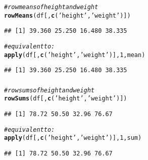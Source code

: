 \documentclass[12pt]{beamer}\usepackage[]{graphicx}\usepackage[]{color}
\makeatletter
\newcommand{\hlnum}[1]{\textcolor[rgb]{0.686,0.059,0.569}{#1}}%
\newcommand{\hlstr}[1]{\textcolor[rgb]{0.192,0.494,0.8}{#1}}%
\newcommand{\hlcom}[1]{\textcolor[rgb]{0.678,0.584,0.686}{\textit{#1}}}%
\newcommand{\hlstd}[1]{\textcolor[rgb]{0.345,0.345,0.345}{#1}}%
\newcommand{\hlkwd}[1]{\textcolor[rgb]{0.737,0.353,0.396}{\textbf{#1}}}%
\newenvironment{kframe}{%
 \def\at@end@of@kframe{}%
 \ifinner\ifhmode%
  \def\at@end@of@kframe{\end{minipage}}%
  \begin{minipage}{\columnwidth}%
 \fi\fi%
 \def\FrameCommand##1{\hskip\@totalleftmargin \hskip-\fboxsep
 \colorbox{shadecolor}{##1}\hskip-\fboxsep
     \hskip-\linewidth \hskip-\@totalleftmargin \hskip\columnwidth}%
 \MakeFramed {\advance\hsize-\width
   \@totalleftmargin\z@ \linewidth\hsize
   \@setminipage}}%
 {\par\unskip\endMakeFramed%
 \at@end@of@kframe}
\newenvironment{knitrout}{}{} %
\makeatother
\begin{document}
\begin{frame}[fragile]
\frametitle{}

\begin{knitrout}\footnotesize
{}\color{fgcolor}\begin{kframe}
\begin{alltt}
\hlcom{# row means of height and weight}
\hlkwd{rowMeans}\hlstd{(df[ ,}\hlkwd{c}\hlstd{(}\hlstr{'height'}\hlstd{,} \hlstr{'weight'}\hlstd{)])}
\end{alltt}
\begin{verbatim}
## [1] 39.360 25.250 16.480 38.335
\end{verbatim}
\begin{alltt}
\hlcom{# equivalent to:}
\hlkwd{apply}\hlstd{(df[ ,}\hlkwd{c}\hlstd{(}\hlstr{'height'}\hlstd{,} \hlstr{'weight'}\hlstd{)],} \hlnum{1}\hlstd{, mean)}
\end{alltt}
\begin{verbatim}
## [1] 39.360 25.250 16.480 38.335
\end{verbatim}
\end{kframe}
\end{knitrout}

\end{frame}


\begin{frame}[fragile]
\frametitle{}

\begin{knitrout}\footnotesize
{}\color{fgcolor}\begin{kframe}
\begin{alltt}
\hlcom{# row sums of height and weight}
\hlkwd{rowSums}\hlstd{(df[ ,}\hlkwd{c}\hlstd{(}\hlstr{'height'}\hlstd{,} \hlstr{'weight'}\hlstd{)])}
\end{alltt}
\begin{verbatim}
## [1] 78.72 50.50 32.96 76.67
\end{verbatim}
\begin{alltt}
\hlcom{# equivalent to:}
\hlkwd{apply}\hlstd{(df[ ,}\hlkwd{c}\hlstd{(}\hlstr{'height'}\hlstd{,} \hlstr{'weight'}\hlstd{)],} \hlnum{1}\hlstd{, sum)}
\end{alltt}
\begin{verbatim}
## [1] 78.72 50.50 32.96 76.67
\end{verbatim}
\end{kframe}
\end{knitrout}

\end{frame}
\end{document}
